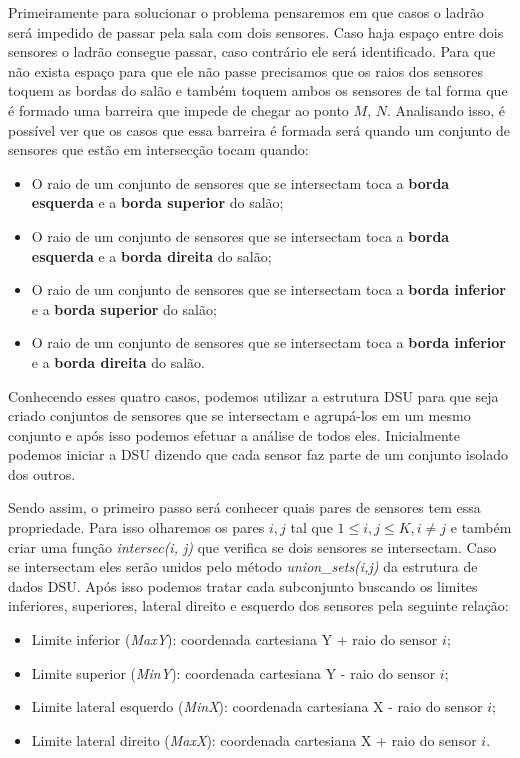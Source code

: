 \documentclass[12pt]{article}
\begin{document}
Primeiramente para solucionar o problema pensaremos em que casos o ladrão será impedido de passar pela sala com dois sensores. Caso haja espaço entre dois sensores o ladrão consegue passar, caso contrário ele será identificado. Para que não exista espaço para que ele não passe precisamos que os raios dos sensores toquem as bordas do salão e também toquem ambos os sensores de tal forma que é formado uma barreira que impede de chegar ao ponto $M$, $N$. Analisando isso, é possível ver que os casos que essa barreira é formada será quando um conjunto de sensores que estão em intersecção tocam quando:
\begin{itemize}
\label{tabelasolucao}
    \item O raio de um conjunto de sensores que se intersectam toca a \textbf{borda esquerda} e a \textbf{borda superior} do salão;
    \item O raio de um conjunto de sensores que se intersectam toca a \textbf{borda esquerda} e a \textbf{borda direita} do salão;
    \item O raio de um conjunto de sensores que se intersectam toca a \textbf{borda inferior} e a \textbf{borda superior} do salão;
    \item O raio de um conjunto de sensores que se intersectam toca a \textbf{borda inferior} e a \textbf{borda direita} do salão.
\end{itemize} 

Conhecendo esses quatro casos, podemos utilizar a estrutura DSU para que seja criado conjuntos de sensores que se intersectam e agrupá-los em um mesmo conjunto e após isso podemos efetuar a análise de todos eles. Inicialmente podemos iniciar a DSU dizendo que cada sensor faz parte de um conjunto isolado dos outros.

Sendo assim, o primeiro passo será conhecer quais pares de sensores tem essa propriedade. Para isso olharemos os pares $i, j$ tal que $1 \leq i, j \leq K, i \neq j$ e também criar uma função \textit{intersec(i, j)} que verifica se dois sensores se intersectam. Caso se intersectam eles serão unidos pelo método \textit{union\_sets(i,j)} da estrutura de dados DSU. Após isso podemos tratar cada subconjunto buscando os limites inferiores, superiores, lateral direito e esquerdo dos sensores pela seguinte relação: 
\begin{itemize}
    \item Limite inferior (\textit{MaxY}): coordenada cartesiana Y + raio do sensor $i$;
    \item Limite superior (\textit{MinY}): coordenada cartesiana Y - raio do sensor $i$;
    \item Limite lateral esquerdo (\textit{MinX}): coordenada cartesiana X - raio do sensor $i$;
    \item Limite lateral direito (\textit{MaxX}): coordenada cartesiana X + raio do sensor $i$.
\end{itemize}
\end{document}
